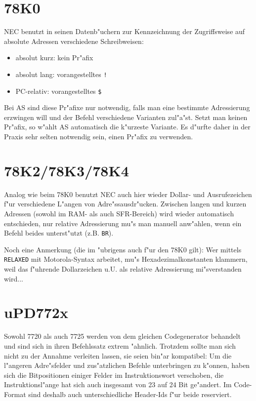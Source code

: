 \documentclass[12pt,a4paper,twoside]{report}
\begin{document}

\section{78K0}
\label{78K0Spec}

NEC benutzt in seinen Datenb"uchern zur Kennzeichnung der Zugriffsweise
auf absolute Adressen verschiedene Schreibweisen:
\begin{itemize}
\item{absolut kurz: kein Pr"afix}
\item{absolut lang: vorangestelltes \verb"!"}
\item{PC-relativ: vorangestelltes \verb"$"}
\end{itemize}
Bei AS sind diese Pr"afixe nur notwendig, falls man eine bestimmte
Adressierung erzwingen will und der Befehl verschiedene Varianten
zul"a"st.  Setzt man keinen Pr"afix, so w"ahlt AS automatisch die
k"urzeste Variante.  Es d"urfte daher in der Praxis sehr selten
notwendig sein, einen Pr"afix zu verwenden.


\section{78K2/78K3/78K4}
\label{78K234Spec}

Analog wie beim 78K0 benutzt NEC auch hier wieder Dollar- und
Ausrufezeichen f"ur verschiedene L"angen von Adre"ssausdr"ucken.
Zwischen langen und kurzen Adressen (sowohl im RAM- als auch
SFR-Bereich) wird wieder automatisch entschieden, nur relative
Adressierung mu"s man manuell anw"ahlen, wenn ein Befehl beides
unterst"utzt (z.B. {\tt BR}).

Noch eine Anmerkung (die im "ubrigens auch f"ur den 78K0 gilt): Wer
mittels {\tt RELAXED} mit Motorola-Syntax arbeitet, mu"s
Hexadezimalkonstanten klammern, weil das f"uhrende Dollarzeichen u.U. als
relative Adressierung mi"sverstanden wird...


\section{uPD772x}

Sowohl 7720 als auch 7725 werden von dem gleichen Codegenerator behandelt
und sind sich in ihren Befehlssatz extrem "ahnlich.  Trotzdem sollte man
sich nicht zu der Annahme verleiten lassen, sie seien bin"ar kompatibel:
Um die l"angeren Adre"sfelder und zus"atzlichen Befehle unterbringen zu
k"onnen, haben sich die Bitpositionen einiger Felder im Instruktionswort
verschoben, die Instruktionsl"ange hat sich auch insgesamt von 23 auf 24
Bit ge"andert.  Im Code-Format sind deshalb auch unterschiedliche
Header-Ids f"ur beide reserviert.
\end{document}
